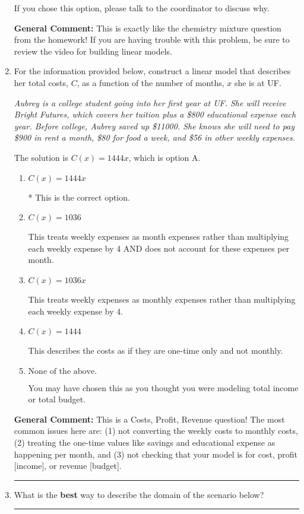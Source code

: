 \documentclass{extbook}[14pt]
\newcommand{\litem}[1]{\item #1

\rule{\textwidth}{0.4pt}}
\begin{document}
\begin{enumerate}
{\begin{enumerate}[label=\Alph*.]
If you chose this option, please talk to the coordinator to discuss why.
\end{enumerate}

\textbf{General Comment:} This is exactly like the chemistry mixture question from the homework! If you are having trouble with this problem, be sure to review the video for building linear models.
}
\litem{
For the information provided below, construct a linear model that describes her total costs, $C$, as a function of the number of months, $x$ she is at UF. 

\begin{center}
    \textit{ Aubrey is a college student going into her first year at UF. She will receive Bright Futures, which covers her tuition plus a \$800 educational expense each year. Before college, Aubrey saved up \$11000. She knows she will need to pay \$900 in rent a month, \$80 for food a week, and \$56 in other weekly expenses. }
\end{center}
The solution is \( C(x) = 1444 x \), which is option A.\begin{enumerate}[label=\Alph*.]
\item \( C(x) = 1444 x \)

* This is the correct option.
\item \( C(x) = 1036 \)

This treats weekly expenses as month expenses rather than multiplying each weekly expense by 4 AND does not account for these expenses per month.
\item \( C(x) = 1036 x \)

This treats weekly expenses as monthly expenses rather than multiplying each weekly expense by 4.
\item \( C(x) = 1444 \)

This describes the costs as if they are one-time only and not monthly.
\item \( \text{None of the above.} \)

You may have chosen this as you thought you were modeling total income or total budget.
\end{enumerate}

\textbf{General Comment:} This is a Costs, Profit, Revenue question! The most common issues here are: (1) not converting the weekly costs to monthly costs, (2) treating the one-time values like savings and educational expense as happening per month, and (3) not checking that your model is for cost, profit [income], or revenue [budget].
}
\litem{
What is the \textbf{best} way to describe the domain of the scenario below?

}
\end{enumerate}
\end{document}
